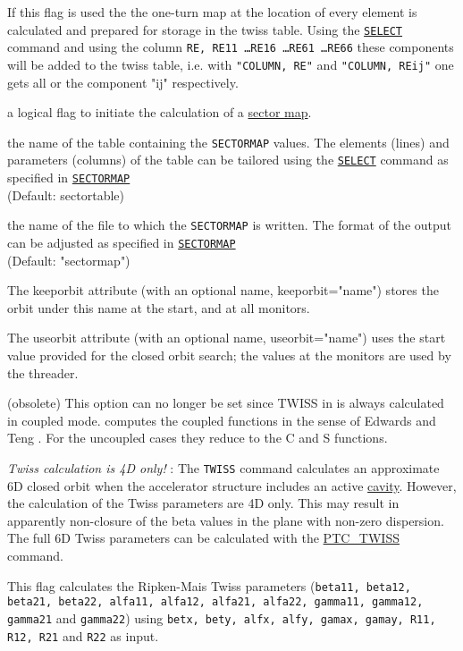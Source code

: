 \begin{madlist}
   If this flag is used the the one-turn map at the
  location of every element is calculated and prepared for
  storage in the twiss table. Using the
  \hyperref[sec:select]{\tt SELECT} command and using
  the column {\tt RE, RE11 \ldots RE16 \ldots RE61 \ldots RE66} these
  components will be added to the twiss table, i.e. with {\tt "COLUMN, RE"} and
  {\tt "COLUMN, REij"} one gets all or the component "ij" respectively.    

   a logical flag to initiate the calculation of a 
  \hyperref[sec:sectormap]{sector map}.
  
   the name of the table containing the {\tt SECTORMAP}
  values. The elements (lines) and parameters (columns) 
  of the table can be tailored using the \hyperref[sec:select]{\tt SELECT} 
  command as specified in \hyperref[sec:sectormap]{\tt SECTORMAP} \\
  (Default: sectortable)

   the name of the file to which the {\tt SECTORMAP} is
  written. 
  The format of the output can be adjusted as specified in 
  \hyperref[sec:sectormap]{\tt SECTORMAP} \\
  (Default: "sectormap")
  
   The keeporbit attribute (with an optional name,
  keeporbit="name") stores the orbit under this name at the
  start, and at all monitors.    

   The useorbit attribute (with an optional name,
  useorbit="name") uses the start value provided for the closed
  orbit search; the values at the monitors are used by the
  threader.    

   (obsolete) This \madeight option can no
  longer be set since TWISS in \madx is always calculated in
  coupled mode. \madx computes the coupled functions in the
  sense of Edwards and Teng \cite{edwards1973}. 
  For the uncoupled cases they reduce to the C and S functions.    
  
  \textit{ Twiss calculation is 4D only!} : The {\tt TWISS}
  command calculates an approximate 6D closed orbit when the
  accelerator structure includes an active
  \hyperref[sec:rfcavity]{cavity}. However, the
  calculation of the Twiss parameters are 4D only. This may
  result in apparently non-closure of the beta values in the
  plane with non-zero dispersion. The full 6D Twiss parameters
  can be calculated with the
  \hyperref[chap:ptc-twiss]{PTC\_TWISS} command.    

   This flag calculates the Ripken-Mais Twiss
  parameters ({\tt beta11, beta12, beta21, beta22, alfa11, alfa12,
  alfa21, alfa22, gamma11, gamma12, gamma21} and {\tt gamma22}) using
  {\tt betx, bety, alfx, alfy, gamax, gamay, R11, R12, R21} and {\tt R22} as
  input.  

\end{madlist}


